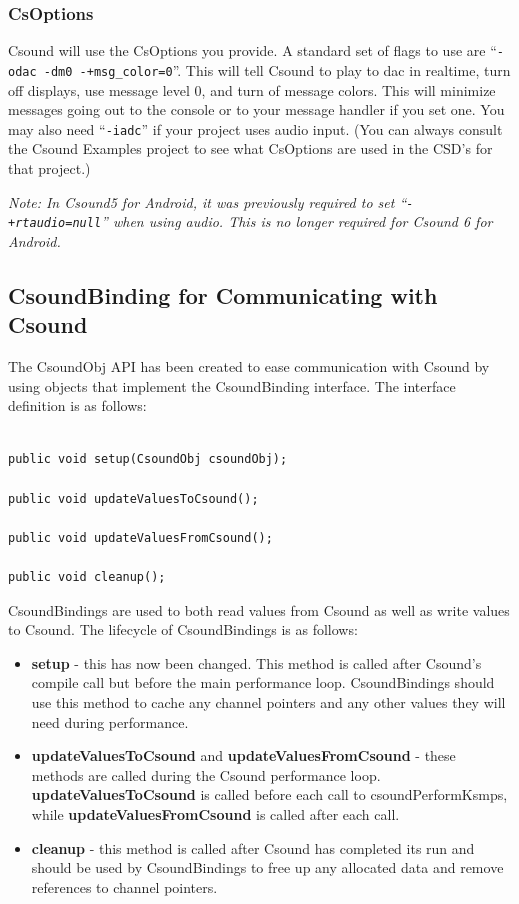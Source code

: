 \documentclass[11pt]{article}
\begin{document}
\subsubsection{CsOptions}

Csound will use the CsOptions you provide.  A standard set of flags to use are ``{\tt -odac -dm0 -+msg\_color=0}''. This will tell Csound to play to dac in realtime, turn off displays, use message level 0, and turn of message colors.  This will minimize messages going out to the console or to your message handler if you set one.  You may also need ``{\tt -iadc}'' if your project uses audio input. (You can always consult the Csound Examples project to see what CsOptions are used in the CSD's for that project.) 

\emph{Note: In Csound5 for Android, it was previously required to set \linebreak ``{\tt -+rtaudio=null}'' when using audio. This is no longer required for Csound 6 for Android.}
 

\subsection{CsoundBinding for Communicating with Csound}

The CsoundObj API has been created to ease communication with Csound by using objects that implement the CsoundBinding interface.  The interface definition is as follows:

\begin{lstlisting}[caption=CsoundBinding interface Definition]

public void setup(CsoundObj csoundObj);
	
public void updateValuesToCsound();
	
public void updateValuesFromCsound();
	
public void cleanup();

\end{lstlisting}

CsoundBindings are used to both read values from Csound as well as write values to Csound.  The lifecycle of CsoundBindings is as follows:

\begin{itemize}
\item \textbf{setup} - this has now been changed. This method is called after Csound's compile call but before the main performance loop. CsoundBindings should use this method to cache any channel pointers and any other values they will need during performance.
\item \textbf{updateValuesToCsound} and \textbf{updateValuesFromCsound} - these methods are called during the Csound performance loop. \textbf{updateValuesToCsound} is called before each call to csoundPerformKsmps, while \textbf{updateValuesFromCsound} is called after each call. 
\item \textbf{cleanup} - this method is called after Csound has completed its run and should be used by CsoundBindings to free up any allocated data and remove references to channel pointers.
\end{itemize}
\end{document}
